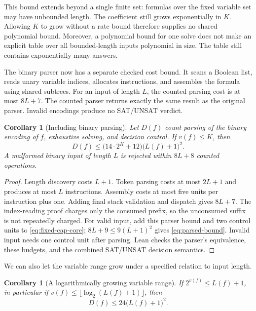 \documentclass[11pt,a4paper]{article}
\numberwithin{equation}{section}
\theoremstyle{plain}
\newtheorem{corollary}[lemma]{Corollary}
\theoremstyle{definition}
\theoremstyle{remark}
\begin{document}
This bound extends beyond a single finite set: formulas over the fixed variable set may have unbounded length. The coefficient still grows exponentially in $K$. Allowing $K$ to grow without a rate bound therefore supplies no shared polynomial bound. Moreover, a polynomial bound for one solve does not make an explicit table over all bounded-length inputs polynomial in size. The table still contains exponentially many answers.

The binary parser now has a separate checked cost bound. It scans a Boolean list, reads unary variable indices, allocates instructions, and assembles the formula using shared subtrees. For an input of length $L$, the counted parsing cost is at most $8L+7$. The counted parser returns exactly the same result as the original parser. Invalid encodings produce no SAT/UNSAT verdict.

\begin{corollary}[Including binary parsing]
\label{cor:parsed-bound}
Let $D(f)$ count parsing of the binary encoding of $f$, exhaustive solving, and decision control. If $v(f)\leq K$, then
\begin{equation}
D(f)\leq \bigl(14\cdot2^K+12\bigr)\bigl(L(f)+1\bigr)^2.
\label{eq:parsed-bound}
\end{equation}
A malformed binary input of length $L$ is rejected within $8L+8$ counted operations.
\end{corollary}

\begin{proof}
Length discovery costs $L+1$. Token parsing costs at most $2L+1$ and produces at most $L$ instructions. Assembly costs at most five units per instruction plus one. Adding final stack validation and dispatch gives $8L+7$. The index-reading proof charges only the consumed prefix, so the unconsumed suffix is not repeatedly charged. For valid input, add this parser bound and two control units to \eqref{eq:fixed-cap-core}; $8L+9\leq9(L+1)^2$ gives \eqref{eq:parsed-bound}. Invalid input needs one control unit after parsing. Lean checks the parser's equivalence, these budgets, and the combined SAT/UNSAT decision semantics.
\end{proof}

We can also let the variable range grow under a specified relation to input length.
\begin{corollary}[A logarithmically growing variable range]
\label{cor:logarithmic-width}
If $2^{v(f)}\leq L(f)+1$, in particular if $v(f)\leq\lfloor\log_2(L(f)+1)\rfloor$, then
\begin{equation}
D(f)\leq24\bigl(L(f)+1\bigr)^2.
\label{eq:logarithmic-width}
\end{equation}
\end{corollary}
\end{document}
